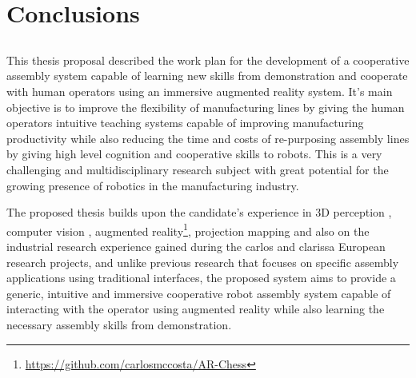 \chapter{Conclusions}\label{chap:conclusions-and-future-work}



\section*{}

This thesis proposal described the work plan for the development of a cooperative assembly system capable of learning new skills from demonstration and cooperate with human operators using an immersive augmented reality system. It's main objective is to improve the flexibility of manufacturing lines by giving the human operators intuitive teaching systems capable of improving manufacturing productivity while also reducing the time and costs of re-purposing assembly lines by giving high level cognition and cooperative skills to robots. This is a very challenging and multidisciplinary research subject with great potential for the growing presence of robotics in the manufacturing industry.

The proposed thesis builds upon the candidate’s experience in 3D perception \cite{Costa2015Diss,Costa2015ICIT,Costa2015Intech,Costa2016Elsevier}, computer vision \cite{Costa2014,Costa2016ICARSC}, augmented reality\footnote{\url{https://github.com/carlosmccosta/AR-Chess}}, projection mapping and also on the industrial research experience gained during the \gls{carlos} and \gls{clarissa} European research projects, and unlike previous research that focuses on specific assembly applications using traditional interfaces, the proposed system aims to provide a generic, intuitive and immersive cooperative robot assembly system capable of interacting with the operator using augmented reality while also learning the necessary assembly skills from demonstration.